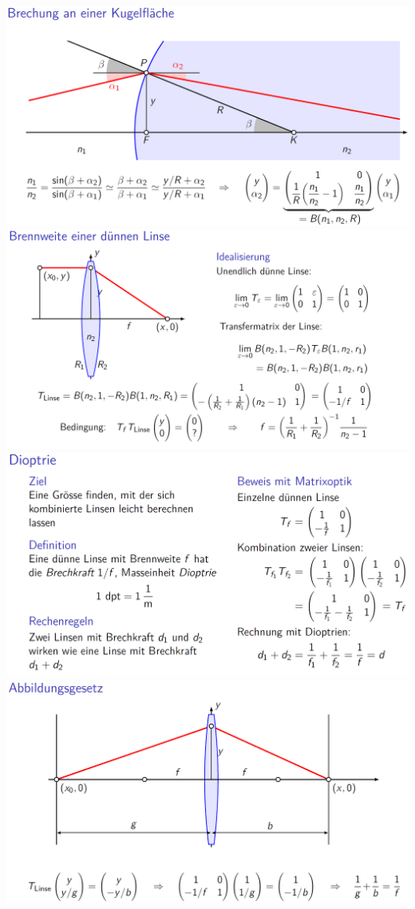 		 \vspace{0.5cm}
		 
		 \includegraphics[width=0.85\linewidth]{Bilder/matrixoptik2} \\
		 
		 \includegraphics[width=0.8\linewidth]{Bilder/matrixoptik3} \\
		 
		 \includegraphics[width=0.8\linewidth]{Bilder/matrixoptik4} \\
		 
		 \includegraphics[width=0.8\linewidth]{Bilder/matrixoptik5}\\
		 
